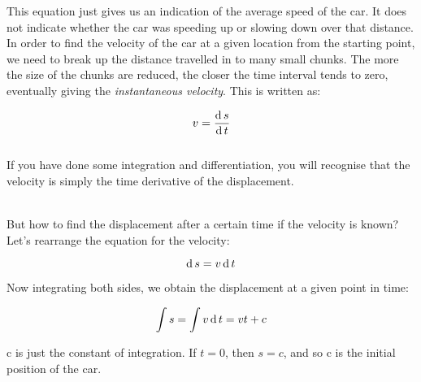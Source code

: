 This equation just gives us an indication of the average speed of the car. It does not indicate whether the car was speeding up or slowing down over that distance. In order to find the velocity of the car at a given location from the starting point, we need to break up the distance travelled in to many small chunks. The more the size of the chunks are reduced, the closer the time interval tends to zero, eventually giving the \textit{instantaneous velocity}. This is written as:



\begin{equation}

v = \frac{\d s}{\d t} 

\label{inst_v}

\end{equation}\\

If you have done some integration and differentiation, you will recognise that the velocity is simply the time derivative of the displacement. \nll


\\

But how to find the displacement after a certain time if the velocity is known? Let's rearrange the equation for the velocity:

 \begin{equation}

\d s = v \d t 

\label{inst_s}

\end{equation}

Now integrating both sides, we obtain the displacement at a given point in time:

  \begin{equation}

\int s = \int v \d t = vt + c

\end{equation}

c is just the constant of integration. If $t=0$, then $s=c$, and so c is the initial position of the car.



